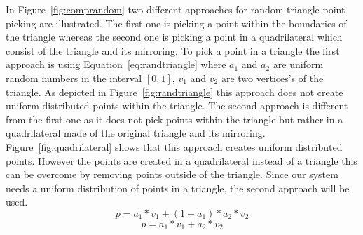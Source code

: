 \documentclass[master,english]{hgbthesis}
\begin{document}
In Figure~\ref{fig:comprandom} two different approaches for random triangle point picking are illustrated. The first one is picking a point within the boundaries of the triangle whereas the second one is picking a point in a  quadrilateral which consist of the triangle and its mirroring. To pick a point in a triangle the first approach is using Equation~\ref{eq:randtriangle} where $a_1$ and $a_2$ are uniform random numbers in the interval $ \left[0,1 \right] $, $v_1$ and $v_2$ are two vertices's of the triangle. As depicted in Figure~\ref{fig:randtriangle} this approach does not create uniform distributed points within the triangle. The second approach is different from the first one as it does not pick points within the triangle but rather in a quadrilateral made of the original triangle and its mirroring. Figure~\ref{fig:quadrilateral} shows that this approach creates uniform distributed points. However the points are created in a quadrilateral instead of a triangle this can be overcome by removing points outside of the triangle. Since our system needs a uniform distribution of points in a triangle, the second approach will be used.
\begin{equation}
	p=a_1*v_1+(1-a_1)*a_2*v_2
	\label{eq:randtriangle}
\end{equation}
\begin{equation}
	p=a_1*v_1+a_2*v_2
	\label{eq:randquad}
\end{equation}
\end{document}
